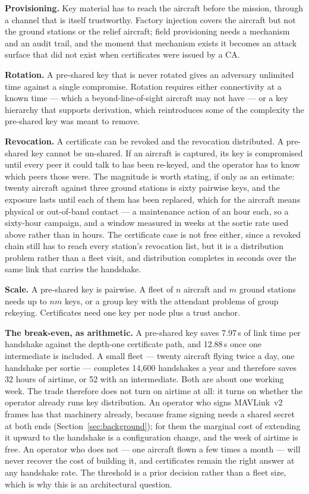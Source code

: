 \documentclass[drones,article,submit,pdftex,moreauthors]{Definitions/mdpi}
\newcommand{\mav}{MAVLink}
\begin{document}
\textbf{Provisioning.} Key material has to reach the aircraft before the
mission, through a channel that is itself trustworthy. Factory
injection covers the aircraft but not the ground stations or the relief
aircraft; field provisioning needs a mechanism and an audit trail, and
the moment that mechanism exists it becomes an attack surface that did
not exist when certificates were issued by a CA.

\textbf{Rotation.} A pre-shared key that is never rotated gives an
adversary unlimited time against a single compromise. Rotation requires
either connectivity at a known time --- which a beyond-line-of-sight
aircraft may not have --- or a key hierarchy that supports derivation,
which reintroduces some of the complexity the pre-shared key was meant
to remove.

\textbf{Revocation.} A certificate can be revoked and the revocation
distributed. A pre-shared key cannot be un-shared. If an aircraft is
captured, its key is compromised until every peer it could talk to has
been re-keyed, and the operator has to know which peers those were. The
magnitude is worth stating, if only as an estimate: twenty aircraft
against three ground stations is sixty pairwise keys, and the exposure
lasts until each of them has been replaced, which for the aircraft means
physical or out-of-band contact --- a maintenance action of an hour each,
so a sixty-hour campaign, and a window measured in weeks at the sortie
rate used above rather than in hours. The certificate case is not free
either, since a revoked chain still has to reach every station's
revocation list, but it is a distribution problem rather than a fleet
visit, and distribution completes in seconds over the same link that
carries the handshake.

\textbf{Scale.} A pre-shared key is pairwise. A fleet of $n$ aircraft
and $m$ ground stations needs up to $nm$ keys, or a group key with the
attendant problems of group rekeying. Certificates need one key per
node plus a trust anchor.

\textbf{The break-even, as arithmetic.} A pre-shared key saves 7.97\,s of
link time per handshake against the depth-one certificate path, and
12.88\,s once one intermediate is included. A small fleet --- twenty
aircraft flying twice a day, one handshake per sortie --- completes
14{,}600 handshakes a year and therefore saves 32 hours of airtime, or
52 with an intermediate. Both are about one working week. The trade
therefore does not turn on airtime at all: it turns on whether the
operator already runs key distribution. An operator who signs
\mav{}~v2 frames has that machinery already, because frame signing needs
a shared secret at both ends (Section~\ref{sec:background}); for them
the marginal cost of extending it upward to the handshake is a
configuration change, and the week of airtime is free. An operator who
does not --- one aircraft flown a few times a month --- will never
recover the cost of building it, and certificates remain the right
answer at any handshake rate. The threshold is a prior decision rather
than a fleet size, which is why this is an architectural question.
\end{document}
